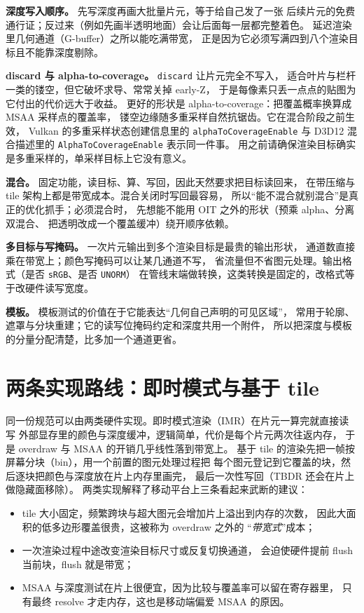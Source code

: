 \documentclass[12pt,a4paper,fontset=fandol]{ctexbook}
\newcommand{\Tp}[1]{\texttt{#1}}
\begin{document}
\textbf{深度写入顺序。} 先写深度再画大批量片元，等于给自己发了一张
后续片元的免费通行证；反过来（例如先画半透明地面）会让后面每一层都完整着色。
延迟渲染里几何通道（G-buffer）之所以能吃满带宽，
正是因为它必须写满四到八个渲染目标且不能靠深度剔除。

\textbf{discard 与 alpha-to-coverage。} \Tp{discard} 让片元完全不写入，
适合叶片与栏杆一类的镂空，但它破坏求导、常常关掉 early-Z，
于是每像素只丢一点点的贴图为它付出的代价远大于收益。
更好的形状是 alpha-to-coverage：把覆盖概率换算成 MSAA 采样点的覆盖率，
镂空边缘随多重采样自然抗锯齿。它在混合阶段之前生效，
Vulkan 的多重采样状态创建信息里的 \Tp{alphaToCoverageEnable} 与
D3D12 混合描述里的 \Tp{AlphaToCoverageEnable} 表示同一件事。
用之前请确保渲染目标确实是多重采样的，单采样目标上它没有意义。

\textbf{混合。} 固定功能，读目标、算、写回，因此天然要求把目标读回来，
在带压缩与 tile 架构上都是带宽成本。混合关闭时写回最容易，
所以``能不混合就别混合''是真正的优化抓手；必须混合时，
先想能不能用 OIT 之外的形状（预乘 alpha、分离双混合、
把透明改成一个覆盖缓冲）绕开顺序依赖。

\textbf{多目标与写掩码。} 一次片元输出到多个渲染目标是最贵的输出形状，
通道数直接乘在带宽上；颜色写掩码可以让某几通道不写，
省流量但不省图元处理。输出格式（是否 \Tp{sRGB}、是否 \Tp{UNORM}）
在管线末端做转换，这类转换是固定的，改格式等于改硬件读写宽度。

\textbf{模板。} 模板测试的价值在于它能表达``几何自己声明的可见区域''，
常用于轮廓、遮罩与分块重建；它的读写位掩码约定和深度共用一个附件，
所以把深度与模板的分量分配清楚，比多加一个通道更省。

\section{两条实现路线：即时模式与基于 tile}

同一份规范可以由两类硬件实现。即时模式渲染（IMR）在片元一算完就直接读写
外部显存里的颜色与深度缓冲，逻辑简单，代价是每个片元两次往返内存，
于是 overdraw 与 MSAA 的开销几乎线性落到带宽上。
基于 tile 的渲染先把一帧按屏幕分块（bin），用一个前置的图元处理过程把
每个图元登记到它覆盖的块，然后逐块把颜色与深度放在片上内存里画完，
最后一次性写回（TBDR 还会在片上做隐藏面移除）。
两类实现解释了移动平台上三条看起来武断的建议：

\begin{itemize}
  \item tile 大小固定，频繁跨块与超大图元会增加片上溢出到内存的次数，
        因此大面积的低多边形覆盖很贵，这被称为 overdraw 之外的
        ``\emph{带宽式}''成本；
  \item 一次渲染过程中途改变渲染目标尺寸或反复切换通道，
        会迫使硬件提前 flush 当前块，flush 就是带宽；
  \item MSAA 与深度测试在片上很便宜，因为比较与覆盖率可以留在寄存器里，
        只有最终 resolve 才走内存，这也是移动端偏爱 MSAA 的原因。
\end{itemize}
\end{document}
